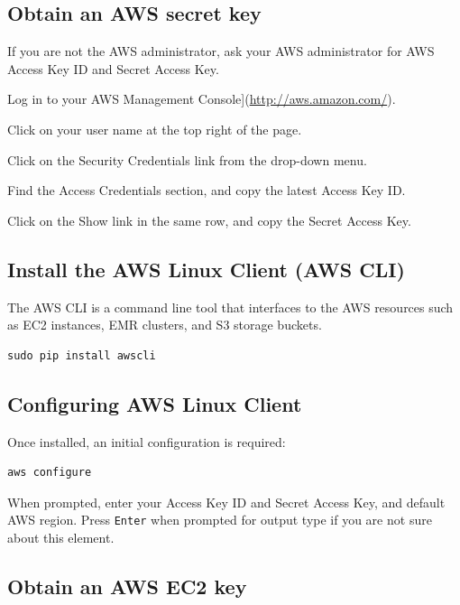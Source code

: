 \documentclass[
]{book}
\begin{document}
\hypertarget{obtain-an-aws-secret-key}{%
\subsection{Obtain an AWS secret key}\label{obtain-an-aws-secret-key}}

If you are not the AWS administrator, ask your AWS administrator for AWS Access Key ID and Secret Access Key.

Log in to your AWS Management Console{]}(\url{http://aws.amazon.com/}).

Click on your user name at the top right of the page.

Click on the Security Credentials link from the drop-down menu.

Find the Access Credentials section, and copy the latest Access Key ID.

Click on the Show link in the same row, and copy the Secret Access Key.

\hypertarget{install-the-aws-linux-client-aws-cli}{%
\subsection{Install the AWS Linux Client (AWS CLI)}\label{install-the-aws-linux-client-aws-cli}}

The AWS CLI is a command line tool that interfaces to the AWS resources such as EC2 instances, EMR clusters, and S3 storage buckets.

\begin{verbatim}
sudo pip install awscli
\end{verbatim}

\hypertarget{configuring-aws-linux-client}{%
\subsection{Configuring AWS Linux Client}\label{configuring-aws-linux-client}}

Once installed, an initial configuration is required:

\begin{verbatim}
aws configure
\end{verbatim}

When prompted, enter your Access Key ID and Secret Access Key, and default AWS region. Press \texttt{Enter} when prompted for output type if you are not sure about this element.

\hypertarget{obtain-an-aws-ec2-key}{%
\subsection{Obtain an AWS EC2 key}\label{obtain-an-aws-ec2-key}}
\end{document}
